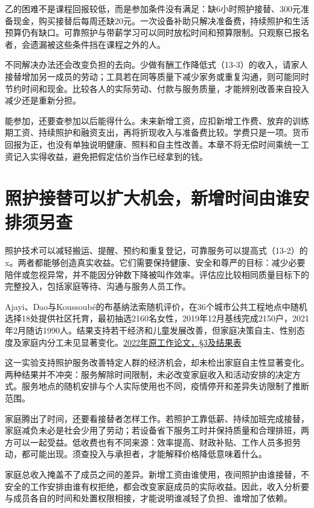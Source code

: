 \documentclass[UTF8,fontset=windows,12pt,a4paper,oneside,openany]{ctexbook}
\begin{document}
乙的困难不是课程回报较低，而是参加条件没有满足：缺6小时照护接替、300元准备现金，购买接替后每周还缺20元。一次设备补助只解决准备费，持续照护和生活预算仍有缺口。可靠照护与带薪学习可以同时放松时间和预算限制。只观察已报名者，会遗漏被这些条件挡在课程之外的人。

不同解决办法还会改变负担的去向。少做有酬工作降低式（13-3）的收入，请家人接替增加另一成员的劳动；工具若在同等质量下减少家务或重复沟通，则可能同时节约时间和现金。比较各人的实际劳动、付款与服务质量，才能辨别改善来自投入减少还是重新分担。

能参加，还要查参加以后能得什么。未来新增工资，应扣新增工作费、放弃的训练期工资、持续照护和融资支出，再将折现收入与准备费比较。学费只是一项。货币回报为正，也没有单独说明健康、照料和自主性改善。本章不将无偿时间乘统一工资记入实得收益，避免把假定估价当作已经拿到的钱。

\section{照护接替可以扩大机会，新增时间由谁安排须另查}

照护技术可以减轻搬运、提醒、预约和重复登记，可靠服务可以提高式（13-2）的x。两者都能够创造真实收益。它们需要保持健康、安全和尊严的目标：减少必要陪伴或忽视异常，并不能因分钟数下降被叫作效率。评估应比较相同质量目标下的完整投入，包括家庭等待、沟通与服务人员工作。

Ajayi、Dao与Koussoubé的布基纳法索随机评价，在36个城市公共工程地点中随机选择18处提供社区托育，最初抽选2160名女性，2019年12月基线完成2150户，2021年2月随访1990人。结果支持若干经济和儿童发展改善，但家庭决策自主、性别态度及家庭内分工未见显著变化。\href{https://documents1.worldbank.org/curated/en/099215111282254210/pdf/IDU09ee54b690865904f71089a60d76ad621601c.pdf}{2022年原工作论文，§3及结果表}

这一实验支持照护服务改善特定人群的经济机会，却未检出家庭自主性显著变化。两种结果并不冲突：服务解除时间限制，未必改变家庭收入和活动安排的决定方式。服务地点的随机安排与个人实际使用也不同，疫情停开和差异失访限制了推断范围。

家庭腾出了时间，还要看接替者怎样工作。若照护工靠低薪、持续加班完成接替，家庭减负未必是社会少用了劳动；若设备省下服务工时并保持质量和合理排班，两方可以一起受益。低收费也有不同来源：效率提高、财政补贴、工作人员多担劳动，都可能出现。须查投入与承担者，才能解释价格降低意味着什么。

家庭总收入掩盖不了成员之间的差异。新增工资由谁使用，夜间照护由谁接替，不安全的工作安排由谁有权拒绝，都会改变家庭成员的实际收益。因此，收入分析要与成员各自的时间和处置权限相接，才能说明谁减轻了负担、谁增加了依赖。
\end{document}
